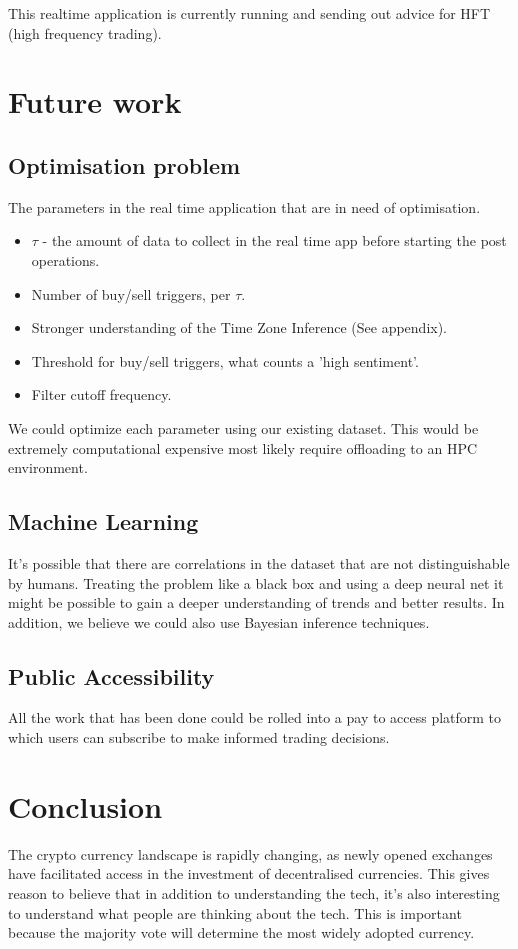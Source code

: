 \documentclass[12pt,journal,compsoc]{IEEEtran}
\begin{document}
This realtime application is currently running and sending out advice for HFT (high frequency trading).
\section{Future work} %
\subsection{Optimisation problem}
The parameters in the real time application that are in need of optimisation. 
\begin{itemize}
	\item $\tau$ - the amount of data to collect in the real time app before starting the post operations.
	\item Number of buy/sell triggers, per $\tau$.
	\item Stronger understanding of the Time Zone Inference (See appendix).
	\item Threshold for buy/sell triggers, what counts a 'high sentiment'.
	\item Filter cutoff frequency.
\end{itemize}
We could optimize each parameter using our existing dataset.
This would be extremely computational expensive most likely require offloading to an HPC environment.

\subsection{Machine Learning}
It's possible that there are correlations in the dataset that are not distinguishable by humans. Treating the problem
like a black box and using a deep neural net it might be possible to gain a deeper understanding of trends and better results. 
In addition, we believe we could also use Bayesian inference techniques.

\subsection{Public Accessibility}
All the work that has been done could be rolled into a pay to access platform to which users can subscribe to make informed
trading decisions.

\section{Conclusion} %
The crypto currency landscape is rapidly changing, as newly opened exchanges have facilitated access in the investment of 
decentralised currencies. 
This gives reason to believe that in addition to understanding 
the tech, it's also interesting to understand what people are thinking about the tech. 
This is important because the majority 
vote will determine the most widely adopted currency.\\
\end{document}
